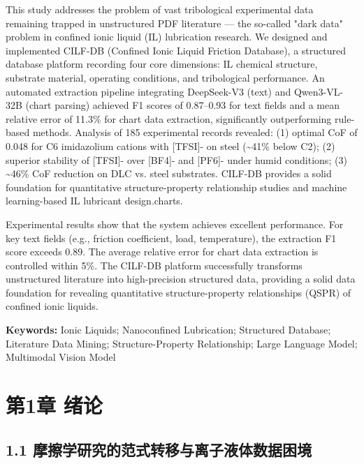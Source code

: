 This study addresses the problem of vast tribological experimental data remaining trapped in unstructured PDF literature --- the so-called "dark data" problem in confined ionic liquid (IL) lubrication research. We designed and implemented CILF-DB (Confined Ionic Liquid Friction Database), a structured database platform recording four core dimensions: IL chemical structure, substrate material, operating conditions, and tribological performance. An automated extraction pipeline integrating DeepSeek-V3 (text) and Qwen3-VL-32B (chart parsing) achieved F1 scores of 0.87--0.93 for text fields and a mean relative error of 11.3\% for chart data extraction, significantly outperforming rule-based methods. Analysis of 185 experimental records revealed: (1) optimal CoF of 0.048 for C6 imidazolium cations with {[}TFSI{]}- on steel (\textasciitilde41\% below C2); (2) superior stability of {[}TFSI{]}- over {[}BF4{]}- and {[}PF6{]}- under humid conditions; (3) \textasciitilde46\% CoF reduction on DLC vs. steel substrates. CILF-DB provides a solid foundation for quantitative structure-property relationship studies and machine learning-based IL lubricant design.charts.

Experimental results show that the system achieves excellent performance. For key text fields (e.g., friction coefficient, load, temperature), the extraction F1 score exceeds 0.89. The average relative error for chart data extraction is controlled within 5\%. The CILF-DB platform successfully transforms unstructured literature into high-precision structured data, providing a solid data foundation for revealing quantitative structure-property relationships (QSPR) of confined ionic liquids.

\textbf{Keywords:} Ionic Liquids; Nanoconfined Lubrication; Structured Database; Literature Data Mining; Structure-Property Relationship; Large Language Model; Multimodal Vision Model

\clearpage
\tableofcontents
\clearpage

\hypertarget{ux7b2c1ux7ae0-ux7eeaux8bba}{%
\section{第1章 绪论}\label{ux7b2c1ux7ae0-ux7eeaux8bba}}

\hypertarget{ux6469ux64e6ux5b66ux7814ux7a76ux7684ux8303ux5f0fux8f6cux79fbux4e0eux79bbux5b50ux6db2ux4f53ux6570ux636eux56f0ux5883}{%
\subsection{1.1 摩擦学研究的范式转移与离子液体数据困境}\label{ux6469ux64e6ux5b66ux7814ux7a76ux7684ux8303ux5f0fux8f6cux79fbux4e0eux79bbux5b50ux6db2ux4f53ux6570ux636eux56f0ux5883}}

